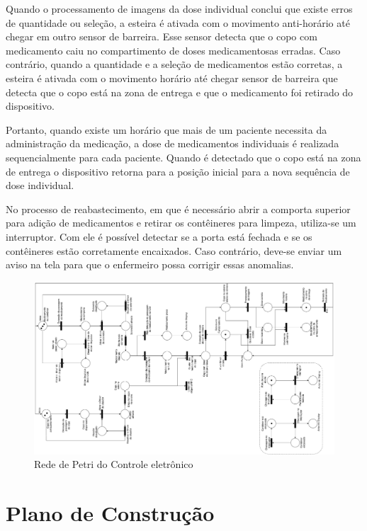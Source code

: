Quando o processamento de imagens da dose individual conclui que existe erros de quantidade ou seleção, a esteira é ativada com o movimento anti-horário até chegar em outro sensor de barreira. Esse sensor detecta que o copo com medicamento caiu no compartimento de doses medicamentosas erradas. Caso contrário, quando a quantidade e a seleção de medicamentos estão corretas, a esteira é ativada com o movimento horário até chegar sensor de barreira que detecta que o copo está na zona de entrega e que o medicamento foi retirado do dispositivo. 

Portanto, quando existe um horário que mais de um paciente necessita da administração da medicação, a dose de medicamentos individuais é realizada sequencialmente para cada paciente. Quando é detectado que o copo está na zona de entrega o dispositivo retorna para a posição inicial para a nova sequência de dose individual.

No processo de reabastecimento, em que é necessário abrir a comporta superior para adição de medicamentos e retirar os contêineres para limpeza, utiliza-se um interruptor. Com ele é possível detectar se a porta está fechada e se os contêineres estão corretamente encaixados. Caso contrário, deve-se enviar um aviso na tela para que o enfermeiro possa corrigir essas anomalias. 

\begin{figure}[H]
    \centering
    \includegraphics[width=1.4\textwidth, angle = -90]{figuras/petri.pdf}
    \caption{Rede de Petri do Controle eletrônico}
    \label{fig:rede_petri}
\end{figure}



\section{Plano de Construção}

